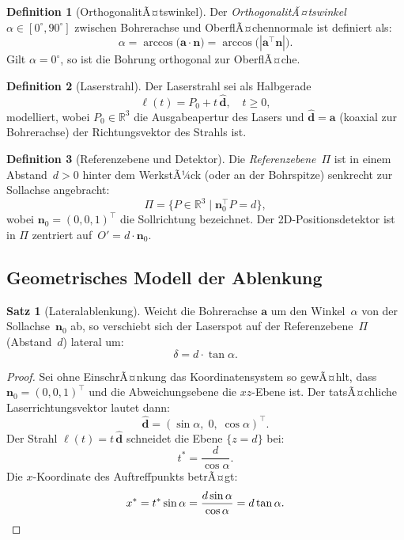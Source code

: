 ﻿\documentclass[a4paper,12pt]{article}
\theoremstyle{definition}
\newtheorem{definition}{Definition}
\newtheorem{satz}{Satz}
\begin{document}
\begin{definition}[OrthogonalitÃ¤tswinkel]
  Der \emph{OrthogonalitÃ¤tswinkel} $\alpha \in [0^\circ, 90^\circ]$ zwischen Bohrerachse
  und OberflÃ¤chennormale ist definiert als:
  \[
    \alpha = \arccos\!\bigl(\mathbf{a} \cdot \mathbf{n}\bigr)
           = \arccos\!\bigl(|\mathbf{a}^\top \mathbf{n}|\bigr).
  \]
  Gilt $\alpha = 0^\circ$, so ist die Bohrung orthogonal zur OberflÃ¤che.
\end{definition}

\begin{definition}[Laserstrahl]
  Der Laserstrahl sei als Halbgerade
  \[
    \ell(t) = P_0 + t\,\hat{\mathbf{d}}, \quad t \geq 0,
  \]
  modelliert, wobei $P_0 \in \mathbb{R}^3$ die Ausgabeapertur des Lasers
  und $\hat{\mathbf{d}} = \mathbf{a}$ (koaxial zur Bohrerachse)
  der Richtungsvektor des Strahls ist.
\end{definition}

\begin{definition}[Referenzebene und Detektor]
  Die \emph{Referenzebene}~$\Pi$ ist in einem Abstand~$d > 0$ hinter dem
  WerkstÃ¼ck (oder an der Bohrspitze) senkrecht zur Sollachse angebracht:
  \[
    \Pi = \bigl\{P \in \mathbb{R}^3 \;\big|\; \mathbf{n}_0^\top P = d\bigr\},
  \]
  wobei $\mathbf{n}_0 = (0,0,1)^\top$ die Sollrichtung bezeichnet.
  Der 2D-Positionsdetektor ist in $\Pi$ zentriert auf~$O' = d \cdot \mathbf{n}_0$.
\end{definition}

\subsection{Geometrisches Modell der Ablenkung}

\begin{satz}[Lateralablenkung]
  \label{satz:ablenkung}
  Weicht die Bohrerachse $\mathbf{a}$ um den Winkel~$\alpha$ von der
  Sollachse~$\mathbf{n}_0$ ab, so verschiebt sich der Laserspot auf der
  Referenzebene~$\Pi$ (Abstand~$d$) lateral um:
  \[
    \delta = d \cdot \tan\alpha.
  \]
\end{satz}

\begin{proof}
  Sei ohne EinschrÃ¤nkung das Koordinatensystem so gewÃ¤hlt, dass
  $\mathbf{n}_0 = (0,0,1)^\top$ und die Abweichungsebene die $xz$-Ebene ist.
  Der tatsÃ¤chliche Laserrichtungsvektor lautet dann:
  \[
    \hat{\mathbf{d}} = (\sin\alpha,\; 0,\; \cos\alpha)^\top.
  \]
  Der Strahl $\ell(t) = t\,\hat{\mathbf{d}}$ schneidet die Ebene
  $\{z = d\}$ bei:
  \[
    t^* = \frac{d}{\cos\alpha}.
  \]
  Die $x$-Koordinate des Auftreffpunkts betrÃ¤gt:
  \[
    x^* = t^* \sin\alpha = \frac{d \sin\alpha}{\cos\alpha} = d \tan\alpha. \qedhere
  \]
\end{proof}
\end{document}
